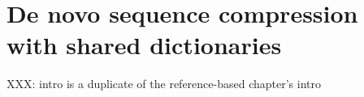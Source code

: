 \documentclass[12pt]{cmuthesis}
\begin{document}






%

\chapter{De novo sequence compression with shared dictionaries}

XXX: intro is a duplicate of the reference-based chapter's intro
\end{document}
